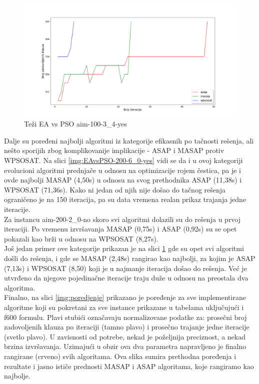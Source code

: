 \documentclass[a4paper]{article}
\begin{document}
\begin{figure}[h!]
\centering
\includegraphics[width=\textwidth]{ea-pso-aim-100-3_4-yes.png}
\caption{Teži EA vs PSO aim-100-3\_4-yes}\label{img:EAvsPSO-100-3_4-yes}
\end{figure}

Dalje su poređeni najbolji algoritmi iz kategorije efikasnih po tačnosti rešenja,
ali nešto sporijih zbog komplikovanije implikacije - ASAP i MASAP protiv WPSOSAT.
Na slici \ref{img:EAvsPSO-200-6_0-yes} vidi se da i u ovoj kategoriji evolucioni algoritmi 
prednjače u odnosu na optimizacije rojem čestica,
pa je i ovde najbolji MASAP (4,50s) u odnosu na svog prethodnika ASAP (11,38s) i
WPSOSAT (71,36s). Kako ni jedan od njih nije došao do tačnog rešenja ograničeno je na 
150 iteracija, pa su data vremena realan prikaz trajanja jedne iteracije. \\

Za instancu aim-200-2\_0-no skoro svi algoritmi dolazili su do rešenja u prvoj iteraciji.
Po vremenu izvršavanja MASAP (0,75s) i ASAP (0,92s) su se opet pokazali kao brži
u odnosu na WPSOSAT (8,27s).\\

Još jedan primer ove kategorije prikazan je na slici \ref{img:EAvsPSO-100-3_4-yes}
gde su opet svi algoritmi došli do rešenja, i gde se MASAP (2,48s) rangirao kao najbolji,
za kojim je ASAP (7,13s) i WPSOSAT (8,50) koji je u najmanje iteracija došao do rešenja.
Već je utvrđeno da njegove pojedinačne iteracije traju duže u odnosu na preostala dva
algoritma. \\

Finalno, na slici \ref{img:poredjenje} prikazano je poređenje za sve
implementirane algoritme koji su pokretani za sve instance prikazane u tabelama
uključujući i f600 formulu. Plavi stubići označavaju normalizovane podatke za:
prosečni broj zadovoljenih klauza po iteraciji (tamno plavo) i prosečno trajanje
jedne iteracije (svetlo plavo). U zavisnosti od potrebe, nekad je poželjnija preciznost, 
a nekad brzina izvršavanja. Uzimajući u obzir ova dva parametra napravljeno je finalno
rangirane (crveno) svih algoritama. Ova slika sumira prethodna poređenja i rezultate
i jasno ističe prednosti MASAP i ASAP algoritama, koje rangiramo kao najbolje. \\
\end{document}
